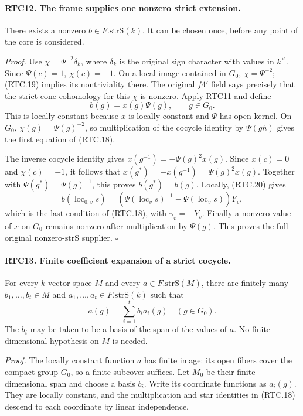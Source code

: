 \paragraph{RTC12. The frame supplies one nonzero strict extension.}
\label{claim:RTC12}
There exists a nonzero \(b\in F.\mathrm{strS}(k)\).  It can
be chosen once, before any point of the core is considered.

\emph{Proof.}
Use
\(\chi=\Psi^{-2}\delta_k\), where \(\delta_k\) is the
original sign character with values in \(k^\times\).  Since
\(\Psi(c)=1\), \(\chi(c)=-1\).  On a local image contained
in \(G_0\), \(\chi=\Psi^{-2}\); (RTC.19) implies its
nontriviality there.  The original \(f4'\) field says precisely
that the strict cone cohomology for this \(\chi\) is nonzero.
Apply RTC11 and define
\[
 b(g)=x(g)\Psi(g),\qquad g\in G_0.
                                                        \tag{RTC.22}
\]
This is locally constant because \(x\) is locally constant and
\(\Psi\) has open kernel.  On \(G_0\), \(\chi(g)=\Psi(g)^{-2}\),
so multiplication of the cocycle identity by \(\Psi(gh)\)
gives the first equation of (RTC.18).

The inverse cocycle identity gives
\(x(g^{-1})=-\Psi(g)^2x(g)\).  Since \(x(c)=0\) and
\(\chi(c)=-1\), it follows that
\(x(g^*)=-x(g^{-1})=\Psi(g)^2x(g)\).  Together with
\(\Psi(g^*)=\Psi(g)^{-1}\), this proves \(b(g^*)=b(g)\).
Locally, (RTC.20) gives
\[
 b(\operatorname{loc}_{0,v}s)
  =(\Psi(\operatorname{loc}_v s)^{-1}
       -\Psi(\operatorname{loc}_v s))Y_v,
\]
which is the last condition of (RTC.18), with \(\gamma_v=-Y_v\).
Finally a nonzero value of \(x\) on \(G_0\) remains nonzero
after multiplication by \(\Psi(g)\).  This proves the full
original nonzero-\(\mathrm{strS}\) supplier. \hfill\(\square\)

\paragraph{RTC13. Finite coefficient expansion of a strict cocycle.}
\label{claim:RTC13}
For every \(k\)-vector space \(M\) and every
\(a\in F.\mathrm{strS}(M)\), there are finitely many
\(b_1,\ldots,b_t\in M\) and
\(a_1,\ldots,a_t\in F.\mathrm{strS}(k)\) such that
\[
 a(g)=\sum_{i=1}^t b_i a_i(g)\quad(g\in G_0).
                                                        \tag{RTC.23}
\]
The \(b_i\) may be taken to be a basis of the span of the values
of \(a\).  No finite-dimensional hypothesis on \(M\) is needed.

\emph{Proof.}
The locally constant function \(a\) has finite image: its open
fibers cover the compact group \(G_0\), so a finite subcover
suffices.  Let \(M_0\) be their finite-dimensional span and choose
a basis \(b_i\).  Write its coordinate functions as \(a_i(g)\).
They are locally constant, and the multiplication and star identities
in (RTC.18) descend to each coordinate by linear independence.

